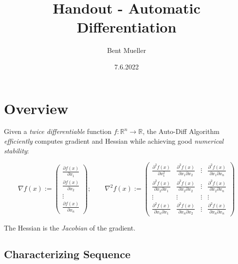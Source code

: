 \documentclass[11pt,a4paper]{article}
\def\R{{\mathbb R}}
\theoremstyle{definition} %
\begin{document}
\title{ \textbf{Handout - Automatic Differentiation} }
\author{Bent Mueller}
\date{7.6.2022}
\maketitle

\section{Overview}

Given a \textit{twice differentiable} function $f: \R^n \to \R$, the
Auto-Diff Algorithm \textit{efficiently} computes gradient and Hessian
while achieving good \textit{numerical stability}:

\[
	\nabla f(x) := \begin{pmatrix}
		\frac{\partial f(x)}{\partial x_1} \\
		\frac{\partial f(x)}{\partial x_2} \\
		\vdots                             \\
		\frac{\partial f(x)}{\partial x_n}
	\end{pmatrix} ;
	\qquad
	\nabla ^2 f(x) :=
	\begin{pmatrix}
		\frac{\partial^2 f(x)}{\partial x_1^2}            &
		\frac{\partial^2 f(x)}{\partial x_1 \partial x_2} &
		\vdots                                            &
		\frac{\partial^2 f(x)}{\partial x_1 \partial x_n}   \\
		\frac{\partial^2 f(x)}{\partial x_2 \partial x_1} &
		\frac{\partial^2 f(x)}{\partial x_2 \partial x_2} &
		\vdots                                            &
		\frac{\partial^2 f(x)}{\partial x_2 \partial x_n}   \\
		\vdots                                            &
		\vdots                                            &
		\vdots                                            &
		\vdots                                              \\
		\frac{\partial^2 f(x)}{\partial x_n \partial x_1} &
		\frac{\partial^2 f(x)}{\partial x_n \partial x_2} &
		\vdots                                            &
		\frac{\partial^2 f(x)}{\partial x_n \partial x_n}
	\end{pmatrix}
\]

The Hessian is the \textit{Jacobian} of the gradient.

\subsection{Characterizing Sequence}
\end{document}
